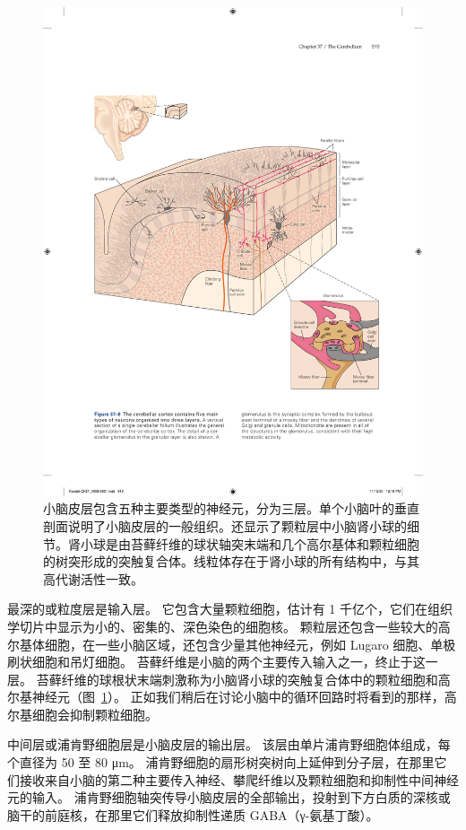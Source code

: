 \begin{figure}[htbp]
	\centering
	\includegraphics[width=0.9\linewidth]{chap37/fig_37_8}
	\caption{小脑皮层包含五种主要类型的神经元，分为三层。单个小脑叶的垂直剖面说明了小脑皮层的一般组织。还显示了颗粒层中小脑肾小球的细节。肾小球是由苔藓纤维的球状轴突末端和几个高尔基体和颗粒细胞的树突形成的突触复合体。线粒体存在于肾小球的所有结构中，与其高代谢活性一致。}
	\label{fig:37_8}
\end{figure}


最深的或粒度层是输入层。
它包含大量颗粒细胞，估计有 1 千亿个，它们在组织学切片中显示为小的、密集的、深色染色的细胞核。
颗粒层还包含一些较大的高尔基体细胞，在一些小脑区域，还包含少量其他神经元，例如 Lugaro 细胞、单极刷状细胞和吊灯细胞。
苔藓纤维是小脑的两个主要传入输入之一，终止于这一层。
苔藓纤维的球根状末端刺激称为小脑肾小球的突触复合体中的颗粒细胞和高尔基神经元（图~\ref{fig:37_8}）。
正如我们稍后在讨论小脑中的循环回路时将看到的那样，高尔基细胞会抑制颗粒细胞。


中间层或浦肯野细胞层是小脑皮层的输出层。
该层由单片浦肯野细胞体组成，每个直径为 50 至 80 μm。
浦肯野细胞的扇形树突树向上延伸到分子层，在那里它们接收来自小脑的第二种主要传入神经、攀爬纤维以及颗粒细胞和抑制性中间神经元的输入。
浦肯野细胞轴突传导小脑皮层的全部输出，投射到下方白质的深核或脑干的前庭核，在那里它们释放抑制性递质 GABA（γ-氨基丁酸）。


